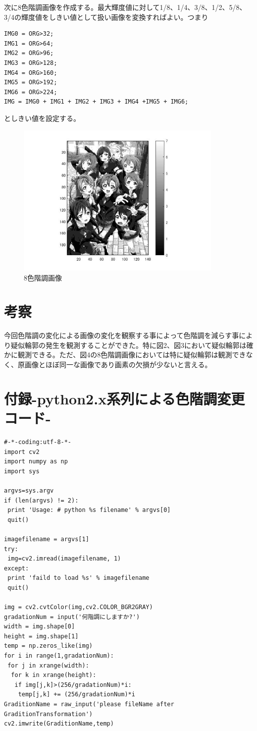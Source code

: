 \documentclass{jsarticle}
\begin{document}
次に8色階調画像を作成する。最大輝度値に対して1/8、1/4、3/8、1/2、5/8、3/4の輝度値をしきい値として扱い画像を変換すればよい。つまり
\begin{lstlisting}[basicstyle=\ttfamily\footnotesize, frame=single]
IMG0 = ORG>32;
IMG1 = ORG>64;
IMG2 = ORG>96;
IMG3 = ORG>128;
IMG4 = ORG>160;
IMG5 = ORG>192;
IMG6 = ORG>224;
IMG = IMG0 + IMG1 + IMG2 + IMG3 + IMG4 +IMG5 + IMG6;
\end{lstlisting}
としきい値を設定する。
\newpage
\begin{figure}[htbp]
 \begin{center}
  \includegraphics[width=10cm]{kadai2-3.jpg}
 \end{center}
 \caption{8色階調画像}
\end{figure}

\section{考察}
今回色階調の変化による画像の変化を観察する事によって色階調を減らす事により疑似輪郭の発生を観測することができた。特に図2、図3において疑似輪郭は確かに観測できる。ただ、図4の8色階調画像においては特に疑似輪郭は観測できなく、原画像とほぼ同一な画像であり画素の欠損が少ないと言える。
\newpage
\section{付録-python2.x系列による色階調変更コード-}
\begin{lstlisting}[basicstyle=\ttfamily\footnotesize, frame=single]
#-*-coding:utf-8-*-
import cv2
import numpy as np
import sys  
  
argvs=sys.argv  
if (len(argvs) != 2):  
 print 'Usage: # python %s filename' % argvs[0]  
 quit()   
            
imagefilename = argvs[1]  
try:  
 img=cv2.imread(imagefilename, 1)  
except:  
 print 'faild to load %s' % imagefilename  
 quit()    

img = cv2.cvtColor(img,cv2.COLOR_BGR2GRAY)
gradationNum = input('何階調にしますか?')
width = img.shape[0]
height = img.shape[1]
temp = np.zeros_like(img)
for i in range(1,gradationNum):
 for j in xrange(width):
  for k in xrange(height):
   if img[j,k]>(256/gradationNum)*i: 
    temp[j,k] += (256/gradationNum)*i
GraditionName = raw_input('please fileName after GraditionTransformation') 
cv2.imwrite(GraditionName,temp)
\end{lstlisting}
\end{document}
